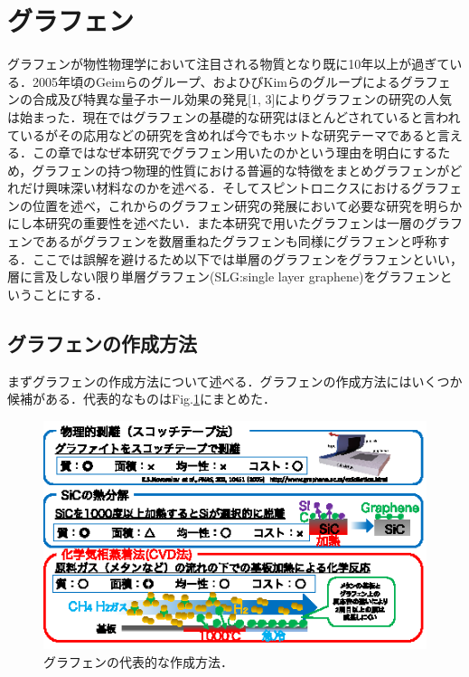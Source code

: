 \section{グラフェン}\label{sec:graphene}
グラフェンが物性物理学において注目される物質となり既に10年以上が過ぎている．2005年頃のGeimらのグループ、およひびKimらのグループによるグラフェンの合成及び特異な量子ホール効果の発見[1, 3]によりグラフェンの研究の人気は始まった．現在ではグラフェンの基礎的な研究はほとんどされていると言われているがその応用などの研究を含めれば今でもホットな研究テーマであると言える．この章ではなぜ本研究でグラフェン用いたのかという理由を明白にするため，グラフェンの持つ物理的性質における普遍的な特徴をまとめグラフェンがどれだけ興味深い材料なのかを述べる．そしてスピントロニクスにおけるグラフェンの位置を述べ，これからのグラフェン研究の発展において必要な研究を明らかにし本研究の重要性を述べたい．また本研究で用いたグラフェンは一層のグラフェンであるがグラフェンを数層重ねたグラフェンも同様にグラフェンと呼称する．ここでは誤解を避けるため以下では単層のグラフェンをグラフェンといい，層に言及しない限り単層グラフェン(SLG:single layer graphene)をグラフェンということにする．

\subsection{グラフェンの作成方法}\label{subsec:graphene}
まずグラフェンの作成方法について述べる．グラフェンの作成方法にはいくつか候補がある．代表的なものはFig.\ref{fig:graphene_howtomake}にまとめた．

\begin{figure}[t]
 \begin{center}
  \includegraphics[width=120mm]{images/graphene_howtomake.eps}
  \end{center}
   \caption{グラフェンの代表的な作成方法．}
 \label{fig:graphene_howtomake}
\end{figure}


